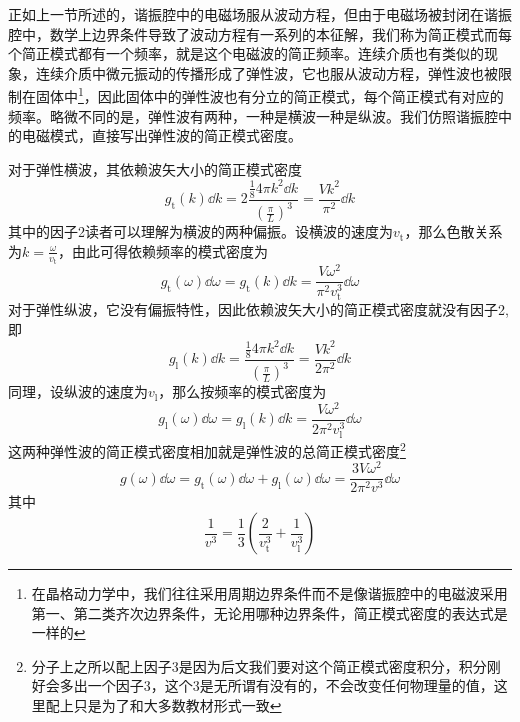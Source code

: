 \documentclass[../../main.tex]{subfiles}
\begin{document}
正如上一节所述的，谐振腔中的电磁场服从波动方程，但由于电磁场被封闭在谐振腔中，数学上边界条件导致了波动方程有一系列的本征解，我们称为简正模式而每个简正模式都有一个频率，就是这个电磁波的简正频率。连续介质也有类似的现象，连续介质中微元振动的传播形成了弹性波，它也服从波动方程，弹性波也被限制在固体中\footnote{在晶格动力学中，我们往往采用周期边界条件而不是像谐振腔中的电磁波采用第一、第二类齐次边界条件，无论用哪种边界条件，简正模式密度的表达式是一样的}，因此固体中的弹性波也有分立的简正模式，每个简正模式有对应的频率。略微不同的是，弹性波有两种，一种是横波一种是纵波。我们仿照谐振腔中的电磁模式，直接写出弹性波的简正模式密度。

对于弹性横波，其依赖波矢大小的简正模式密度
\begin{equation}
    g_{\mathrm{t}}(k)\dd k=2\frac{\frac{1}{8}4\pi k^2\dd k}{\left(\frac{\pi}{L}\right)^3}=\frac{Vk^2}{\pi^2}\dd k
\end{equation}
其中的因子2读者可以理解为横波的两种偏振。设横波的速度为\(v_{\mathrm{t}}\)，那么色散关系为\(\displaystyle k=\frac{\omega}{v_{\mathrm{t}}}\)，由此可得依赖频率的模式密度为
\begin{equation}
    g_\mathrm{t}(\omega)\dd\omega=g_{\mathrm{t}}(k)\dd k=\frac{V\omega^2}{\pi^2v_{\mathrm{t}}^3}\dd \omega
\end{equation}
对于弹性纵波，它没有偏振特性，因此依赖波矢大小的简正模式密度就没有因子2,即
\begin{equation}
    g_{\mathrm{l}}(k)\dd k=\frac{\frac{1}{8}4\pi k^2\dd k}{\left(\frac{\pi}{L}\right)^3}=\frac{Vk^2}{2\pi^2}\dd k
\end{equation}
同理，设纵波的速度为\(v_{\mathrm{l}}\)，那么按频率的模式密度为
\begin{equation}
    g_\mathrm{l}(\omega)\dd\omega=g_{\mathrm{l}}(k)\dd k=\frac{V\omega^2}{2\pi^2v_{\mathrm{l}}^3}\dd \omega
\end{equation}
这两种弹性波的简正模式密度相加就是弹性波的总简正模式密度\footnote{分子上之所以配上因子3是因为后文我们要对这个简正模式密度积分，积分刚好会多出一个因子3，这个3是无所谓有没有的，不会改变任何物理量的值，这里配上只是为了和大多数教材形式一致}
\begin{equation}
    g(\omega)\dd\omega=g_\mathrm{t}(\omega)\dd\omega+g_\mathrm{l}(\omega)\dd\omega=\frac{3V\omega^2}{2\pi^2v^3}\dd \omega
\end{equation}
其中
\begin{equation}
    \frac{1}{v^3}=\frac{1}{3}\left(\frac{2}{v_{\mathrm{t}}^3}+\frac{1}{v_{\mathrm{l}}^3}\right)
\end{equation}
\end{document}
